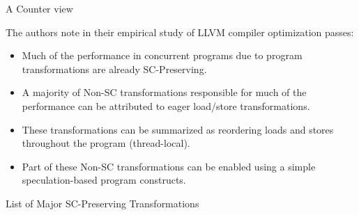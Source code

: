 \documentclass{beamer}
\begin{document}
    \begin{frame}{A Counter view}

        The authors note in their empirical study of LLVM compiler optimization passes:
        \begin{itemize}
            \item Much of the performance in concurrent programs due to program transformations are already SC-Preserving. 
            \item A majority of Non-SC transformations responsible for much of the performance can be attributed to eager load/store transformations.
            \item These transformations can be summarized as reordering loads and stores throughout the program (thread-local).
            \item Part of these Non-SC transformations can be enabled using a simple speculation-based program constructs.  
        \end{itemize}
        
    \end{frame}


    \begin{frame}{List of Major SC-Preserving Transformations}

        \begin{figure}
        \end{figure}

    \end{frame}
\end{document}
